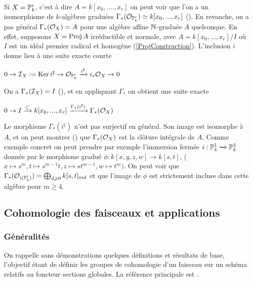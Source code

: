 \begin{rem}
Si $X=\mathbb{P}_k^r$, c'est à dire $A=k[x_0,....,x_r]$ on peut voir que l'on a un isomorphisme de $k$-algèbres graduées $\Gamma_*(\mathcal{O}_{\mathbb{P}_k^r})\simeq k[x_0,...,x_r]$ (\cite[II.5.13]{Hartshorne}). En revanche, on a pas général $\Gamma_*(\mathcal{O}_X)=A$ pour une algèbre affine $\mathbb{N}$-graduée $A$ quelconque. En effet, supposons $X=\operatorname{Proj} A$ irréductible et normale, avec $A=k[x_0,...,x_r]/I$ où $I$ est un idéal premier radical et homogène (\ref{ProjConstruction}). L'inclusion $i$ donne lieu à une suite exacte courte
\begin{center}
$0\rightarrow\mathcal{I}_X:=\operatorname{Ker} i^\sharp\rightarrow\mathcal{O}_{\mathbb{P}_k^r}\xrightarrow{i^\sharp}i_*\mathcal{O}_X\rightarrow 0$
\end{center}
On a $\Gamma_*(\mathcal{I}_X)=I$ (\cite[ex II.5.10]{Hartshorne}), et en appliquant $\Gamma_*$ on obtient une suite exacte
\begin{center}
$0\rightarrow I \xrightarrow{\subset} k[x_0,...,x_r]\xrightarrow{\Gamma_*(i^\sharp)}\Gamma_*(\mathcal{O}_X)$
\end{center}

Le morphisme $\Gamma_*(i^\sharp)$ n'est pas surjectif en général. Son image est isomorphe à $A$, et on peut montrer (\cite[II ex 5.14]{Hartshorne}) que $\Gamma_*(\mathcal{O}_X)$ est la clôture intégrale de $A$. Comme exemple concret on peut prendre par exemple l'immersion fermée $i:\mathbb{P}_k^1\xhookrightarrow{}\mathbb{P}_k^3$ donnée par le morphisme gradué $\phi:k[x,y,z,w]\rightarrow k[s,t]$, ($x\mapsto s^m, t\mapsto s^{m-1}t, z\mapsto st^{m-1},w\mapsto t^m)$. On peut voir que $\Gamma_*(\mathcal{O}_{i(\mathbb{P}_k^1)})=\bigoplus_{d\geqslant 0}k[s,t]_{md}$ et que l'image de $\phi$ est strictement incluse dans cette algèbre pour $m\geq 4$.

\end{rem}

\subsection{Cohomologie des faisceaux et applications}

\subsubsection{Généralités}

On rappelle sans démonstrations quelques définitions et résultats de base, l'objectif étant de définir les groupes de cohomologie d'un faisceau sur un schéma relatifs au foncteur sections globales. La référence principale est \cite[chap III]{Hartshorne}.\\


